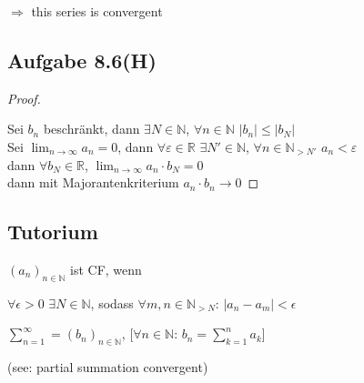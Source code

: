 $\Rightarrow$ this series is convergent

\newpage

\subsection{Aufgabe 8.6(H)}

\begin{proof}
$ $\newline

Sei $b_n$ beschränkt, dann $\exists N\in\mathbb{N}$, $\forall n\in\mathbb{N}$ $|b_n|\leq |b_N|$\\

Sei $\lim_{n\rightarrow\infty}a_n=0$, dann $\forall\varepsilon\in\mathbb{R}$ $\exists N'\in\mathbb{N}$, $\forall n\in\mathbb{N}_{>N'}$ $a_n<\varepsilon$\\

dann $\forall b_N\in\mathbb{R}$, $\lim_{n\rightarrow\infty}a_n\cdot b_N=0$\\

dann mit Majorantenkriterium $a_n\cdot b_n\rightarrow0$

\end{proof}

\newpage

\subsection{Tutorium}

\begin{definition}
$(a_n)_{n\in\mathbb{N}}$ ist CF, wenn

$\forall\epsilon>0$ $\exists N\in\mathbb{N}$, sodass $\forall m,n\in\mathbb{N}_{>N}$: $|a_n-a_m|<\epsilon$
\end{definition}

\begin{definition}[Reihe]
$\sum_{n=1}^{\infty}=(b_n)_{n\in\mathbb{N}}$, [$\forall n\in\mathbb{N}$: $b_n=\sum_{k=1}^n a_k$]

(see: partial summation convergent)
\end{definition}
